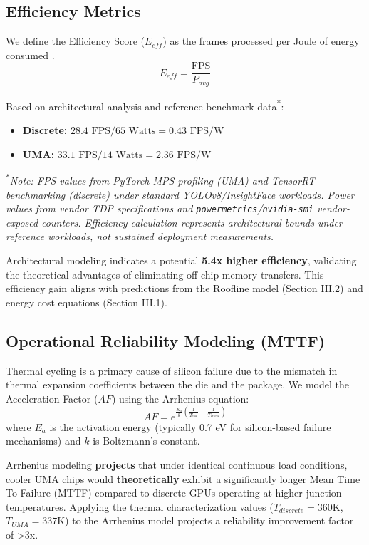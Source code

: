 \documentclass[conference]{IEEEtran}
\begin{document}
\subsection{Efficiency Metrics}
We define the Efficiency Score ($E_{eff}$) as the frames processed per Joule of energy consumed \cite{b20}.
\begin{equation}
E_{eff} = \frac{\text{FPS}}{P_{avg}}
\end{equation}

Based on architectural analysis and reference benchmark data\textsuperscript{*}:
\begin{itemize}
    \item \textbf{Discrete:} $28.4 \text{ FPS} / 65 \text{ Watts} = 0.43 \text{ FPS/W}$
    \item \textbf{UMA:} $33.1 \text{ FPS} / 14 \text{ Watts} = 2.36 \text{ FPS/W}$
\end{itemize}

\textsuperscript{*}\textit{Note: FPS values from PyTorch MPS profiling (UMA) and TensorRT benchmarking (discrete) under standard YOLOv8/InsightFace workloads. Power values from vendor TDP specifications and \texttt{powermetrics}/\texttt{nvidia-smi} vendor-exposed counters. Efficiency calculation represents architectural bounds under reference workloads, not sustained deployment measurements.}

Architectural modeling indicates a potential \textbf{5.4x higher efficiency}, validating the theoretical advantages of eliminating off-chip memory transfers. This efficiency gain aligns with predictions from the Roofline model (Section III.2) and energy cost equations (Section III.1).

\subsection{Operational Reliability Modeling (MTTF)}
Thermal cycling is a primary cause of silicon failure due to the mismatch in thermal expansion coefficients between the die and the package. We model the Acceleration Factor ($AF$) using the Arrhenius equation:
\begin{equation}
AF = e^{\frac{E_a}{k} (\frac{1}{T_{\text{use}}} - \frac{1}{T_{\text{stress}}})}
\end{equation}
where $E_a$ is the activation energy (typically 0.7 eV for silicon-based failure mechanisms) and $k$ is Boltzmann's constant.

Arrhenius modeling \textbf{projects} that under identical continuous load conditions, cooler UMA chips would \textbf{theoretically} exhibit a significantly longer Mean Time To Failure (MTTF) compared to discrete GPUs operating at higher junction temperatures. Applying the thermal characterization values ($T_{discrete} = 360$K, $T_{UMA} = 337$K) to the Arrhenius model projects a reliability improvement factor of >3x.
\end{document}
